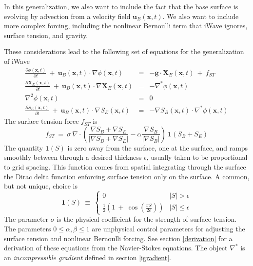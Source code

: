 \documentclass{article}
\def\xvec{\textbf{x}}
\def\gvec{\textbf{g}}
\def\uvec{\textbf{u}}
\def\Xvec{\textbf{X}}
\def\inabla{\nabla^{*}}
\begin{document}
In this generalization, we also want to include the fact that the base surface is evolving by advection from a velocity field $\uvec_B(\xvec,t)$.  We also want to include more complex forcing, including the nonlinear Bernoulli term that iWave ignores, surface tension, and gravity.

These considerations lead to the following set of equations for the generalization of iWave
\begin{eqnarray}
\frac{\partial \phi(\xvec,t)}{\partial t} \ +\ \uvec_B(\xvec,t)\cdot\nabla\phi(\xvec,t) &=& -\gvec\cdot\Xvec_E(\xvec,t)
\ +\  f_{ST}  \label{phieqn}\\
\frac{\partial \Xvec_E(\xvec,t)}{\partial t} \ +\ \uvec_B(\xvec,t)\cdot\nabla\Xvec_E(\xvec,t) &=& -\inabla\phi(\xvec,t) \label{xeeqn}  \\
\nabla^2\phi(\xvec,t) &=& 0 \\
\frac{\partial S_E(\xvec,t)}{\partial t} \ +\ \uvec_B(\xvec,t)\cdot\nabla S_E(\xvec,t) &=& -\nabla S_B(\xvec,t)\cdot\inabla\phi(\xvec,t) \label{seqn}
\end{eqnarray}
The surface tension force $f_{ST}$ is
\begin{equation}
f_{ST} \ =\  \sigma\  \nabla\cdot\left(  \frac{\nabla S_B + \nabla S_E}{ |  \nabla S_B + \nabla S_E |  } - \alpha  \frac{\nabla S_B}{ |  \nabla S_B |  } \right) \ \textbf{1}(S_B+S_E)
\end{equation} 
The quantity $\textbf{1}(S)$ is zero away from the surface, one at the surface, and ramps smoothly between through a desired thickness $\epsilon$, usually taken to be proportional to grid spacing.  This function comes from spatial integrating through the surface the Dirac delta function enforcing surface tension only on the surface.  A common, but not unique, choice is
\begin{equation}
\textbf{1}(S)\ \equiv\ \left\{  \begin{array}{ll}
                                      0 & |S| > \epsilon  \\
                                      \frac{1}{2}\left( 1\ +\ \cos\left(\frac{\pi S}{2\epsilon}\right)  \right) & |S| \leq \epsilon
                                \end{array}  \right.
\end{equation}
The parameter $\sigma$ is the physical coefficient for the strength of surface tension.  The parameters $0\leq\alpha,\beta\leq 1$ are unphysical control parameters for adjusting the surface tension and nonlinear Bernoulli forcing.
See section \ref{derivation} for a derivation of these equations from the Navier-Stokes equations. The object $\inabla$ is an {\em incompressible gradient} defined in section \ref{igradient}.
\end{document}
